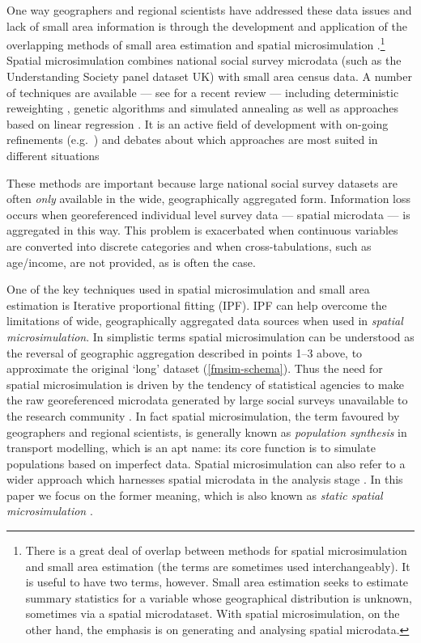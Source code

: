 \documentclass[a4paper,10pt]{article}
\begin{document}
One way geographers and regional scientists have addressed
these data issues and lack of small area information is through the development
and application of the overlapping methods of small area estimation and
spatial microsimulation \citep{Ballas2005c,Hermes2012a}.\footnote{There
is a great deal of overlap between methods for spatial microsimulation and
small area estimation (the terms are sometimes used
interchangeably). It is useful
to have two terms, however. Small
area estimation seeks to estimate summary statistics for a variable whose
geographical distribution is unknown, sometimes via a spatial microdataset. With spatial
microsimulation, on the other hand, the emphasis is on generating and analysing
spatial microdata.}
Spatial microsimulation combines national social survey microdata
(such as the Understanding Society panel dataset UK) with small area census data.
A number of techniques are available --- see \citet{tanton2014review} for a recent review ---
including deterministic reweighting \citep{Birkin1989a},
genetic algorithms and simulated annealing \citep{Williamson1998}
as well as approaches based on linear regression \citep{Harding2011}.
It is an active field of development with on-going refinements
(e.g.~\citealp{Lovelace2013-trs,Pritchard2012}) and debates
about which approaches are most suited in different situations
\citep{harland2012,Hermes2012a,Smith2009,whitworth2013evaluations,Williamson2013}

These methods are important because
large national social survey datasets are often \emph{only} available in
the wide, geographically aggregated form. Information loss occurs when
georeferenced individual level survey data ---
spatial microdata --- is aggregated in this way. This problem is exacerbated
when continuous variables are converted into discrete categories and when
cross-tabulations, such as age/income, are not provided, as is often the case.

One of the key techniques used in spatial microsimulation and small area estimation is
Iterative proportional fitting (IPF). IPF can help overcome the limitations of wide,
geographically aggregated data sources when used in
\emph{spatial microsimulation}. In simplistic terms spatial microsimulation can be understood
as the reversal of geographic aggregation described in points 1--3 above,
to approximate the original `long' dataset (\cref{fmsim-schema}).
Thus the need for spatial microsimulation is driven by
the tendency of statistical agencies to make the raw georeferenced microdata generated 
by large social surveys unavailable to the research community \citep{Lee2009}.
In fact spatial microsimulation, the term favoured by geographers and regional scientists, is
generally known as \emph{population synthesis} in transport modelling, which 
is an apt name: its core function is to simulate populations based on 
imperfect data. Spatial microsimulation can also refer to a wider approach which
harnesses spatial microdata in the analysis stage \citep{Holm1987, Lovelace2014-jtg}.
In this paper we focus on the former meaning, which is also known as \emph{static spatial microsimulation}
\citep{Ballas2005c}.
\end{document}
